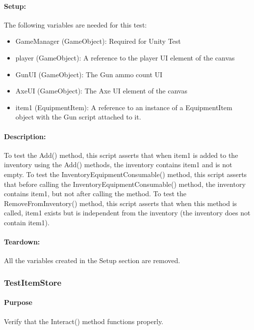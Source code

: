 \documentclass[12pt, titlepage]{article}
\begin{document}
{\paragraph{Setup: } The following variables are needed for this test:
\begin{itemize}
	\item GameManager (GameObject): Required for Unity Test
	\item  player (GameObject): A reference to the player UI element of the canvas
	\item  GunUI (GameObject): The Gun ammo count UI
	\item AxeUI (GameObject): The Axe UI element of the canvas
	\item item1 (EquipmentItem): A reference to an instance of a EquipmentItem object with the Gun script attached to it.
	
\end{itemize}
\paragraph{Description: }
To test the Add() method, this script asserts that when item1 is added to the inventory using the Add() methods, the inventory contains item1 and is not empty.
\newline
To test the InventoryEquipmentConsumable() method, this script asserts that before calling the InventoryEquipmentConsumable() method, the inventory contains item1, but not after calling the method.
\newline
To test the RemoveFromInventory() method, this script asserts that when this method is called, item1 exists but is independent from the inventory (the inventory does not contain item1).

\paragraph{Teardown: } All the variables created in the Setup section are removed.

\subsubsection{Test\textunderscore ItemStore}

\paragraph{Purpose} Verify that the Interact() method functions properly.

}
\end{document}
